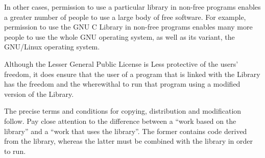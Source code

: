 {In other cases, permission to use a particular library in non-free programs 
enables a greater number of people to use a large body of free software. For 
example, permission to use the GNU C Library in non-free programs enables many 
more people to use the whole GNU operating system, as well as its variant, the 
GNU/Linux operating system.

Although the Lesser General Public License is Less protective of the users' 
freedom, it does ensure that the user of a program that is linked with the 
Library has the freedom and the wherewithal to run that program using a modified 
version of the Library.

The precise terms and conditions for copying, distribution and modification 
follow. Pay close attention to the difference between a ``work based on the 
library'' and a ``work that uses the library''. The former contains code derived 
from the library, whereas the latter must be combined with the library in order 
to run. 
}

